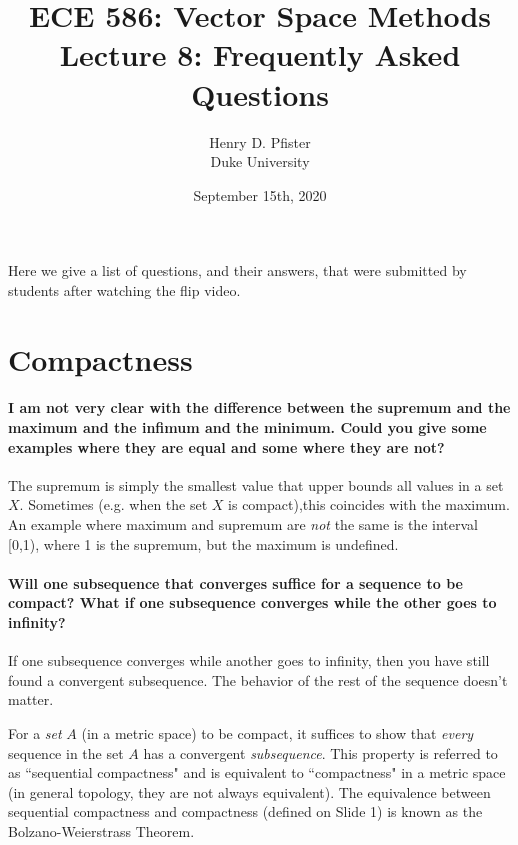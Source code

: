\documentclass[10pt,english]{article}
\begin{document}
\title{ECE 586: Vector Space Methods \\ Lecture 8: Frequently Asked Questions}
\author{Henry D. Pfister \\ Duke University}
\date{September 15th, 2020}

\maketitle

Here we give a list of questions, and their answers, that were submitted by students after watching the flip video.

\section{Compactness}

\paragraph{I am not very clear with the difference between the supremum and the maximum and the infimum and the minimum. Could you give some examples where they are equal and some where they are not?}
The supremum is simply the smallest value that upper bounds all values in a set $X$. Sometimes (e.g. when the set $X$ is compact),this coincides with the maximum. An example where maximum and supremum are \textit{not} the same is the interval [0,1), where 1 is the supremum, but the maximum is undefined.



\paragraph{Will one subsequence that converges suffice for a sequence to be compact? What if one subsequence converges while the other goes to infinity?}
If one subsequence converges while another goes to infinity, then you have still found a convergent subsequence.
The behavior of the rest of the sequence doesn't matter.

For a \textit{set} $A$ (in a metric space) to be compact, it suffices to show that \textit{every} sequence in the set $A$ has a convergent \textit{subsequence}.
This property is referred to as ``sequential compactness" and is equivalent to ``compactness" in a metric space (in general topology, they are not always equivalent).
The equivalence between sequential compactness and compactness (defined on Slide 1) is known as the Bolzano-Weierstrass Theorem.
\end{document}
